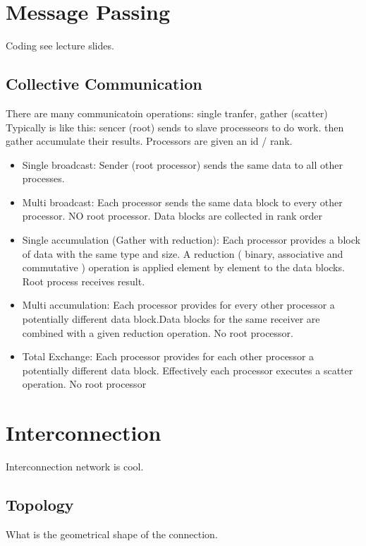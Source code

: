 \documentclass{article}
\begin{document}
\section{Message Passing}
Coding see lecture slides.

\subsection{Collective Communication}
There are many communicatoin operations: single tranfer, gather (scatter)
Typically is like this: sencer (root) sends to slave processeors to do work. then gather accumulate their results.
Processors are given an id / rank.
\begin{itemize}
    \item Single broadcast: Sender (root processor) sends the same data to all other processes.
    \item Multi broadcast: Each processor sends the same data block to every other processor. NO root processor. Data blocks are collected in rank order
    \item Single accumulation (Gather with reduction): Each processor provides a block of data with the same type and size. A reduction ( binary, associative and commutative ) operation is applied element by element to the data blocks. Root process receives result.
    \item Multi accumulation:  Each processor provides for every other processor a potentially different data block.Data blocks for the same receiver are combined with a given reduction operation. No root processor.
    \item Total Exchange: Each processor provides for each other processor a potentially different data block. Effectively each processor executes a scatter operation. No root processor
\end{itemize}

\section{Interconnection}

Interconnection network is cool.

\subsection{Topology}
What is the geometrical shape of the connection.
\end{document}
